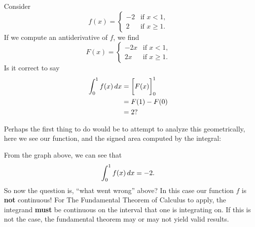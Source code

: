 \documentclass{ximera}
\begin{document}
\begin{question}
  Consider
  \[
  f(x) =
  \begin{cases}
    -2  &\text{if $x< 1$,}\\
    2 &\text{if $x\ge 1$.}
  \end{cases}
  \]
  If we compute an antiderivative of $f$, we find
  \[
  F(x) =
  \begin{cases}
    -2x  &\text{if $x< 1$,}\\
    2x &\text{if $x\ge 1$.}
  \end{cases}
  \]
  Is it correct to say
  \begin{align*}
    \int_0^1 f(x) \,d x &= \bigg[ F(x) \bigg]_0^1 \\
    &=F(1) - F(0)\\
    &=2 ?
  \end{align*}
  \begin{multipleChoice}
  \end{multipleChoice}
  \begin{feedback}
    Perhaps the first thing to do would be to attempt to analyze this
    geometrically, here we see our function, and the signed area
    computed by the integral:
    \begin{image}
    \end{image}
    From the graph above, we can see that
    \[
    \int_0^1 f(x) \,d x =-2.
    \]
    So now the question is, ``what went wrong'' above? In this case
    our function $f$ is \textbf{not} continuous! For The Fundamental
    Theorem of Calculus to apply, the integrand \textbf{must} be
    continuous on the interval that one is integrating on. If this is
    not the case, the fundamental theorem may or may not yield valid
    results.
  \end{feedback}
\end{question}
\end{document}
